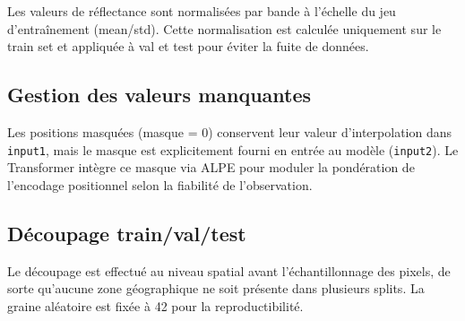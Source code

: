 Les valeurs de réflectance sont normalisées par bande à l'échelle du jeu
d'entraînement (mean/std). Cette normalisation est calculée uniquement sur
le train set et appliquée à val et test pour éviter la fuite de données.

\subsection{Gestion des valeurs manquantes}

Les positions masquées (masque = 0) conservent leur valeur d'interpolation
dans \texttt{input1}, mais le masque est explicitement fourni en entrée au
modèle (\texttt{input2}). Le Transformer intègre ce masque via ALPE pour
moduler la pondération de l'encodage positionnel selon la fiabilité de
l'observation.

\subsection{Découpage train/val/test}

Le découpage est effectué au niveau spatial avant l'échantillonnage des
pixels, de sorte qu'aucune zone géographique ne soit présente dans plusieurs
splits. La graine aléatoire est fixée à 42 pour la reproductibilité.

\cleardoublepage
